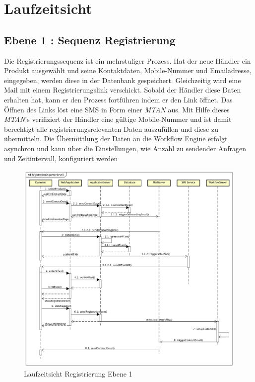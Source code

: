 \graphicspath{{./images/}}

\chapter{Laufzeitsicht}

\section{Ebene 1 : Sequenz Registrierung}

Die Registrierungssequenz ist ein mehrstufiger Prozess. Hat der neue Händler ein Produkt ausgewählt und seine Kontaktdaten, Mobile-Nummer und Emailadresse, eingegeben, werden diese in der Datenbank gespeichert. Gleichzeitig wird eine Mail mit einem Registrierungslink verschickt. Sobald der Händler diese Daten erhalten hat, kann er den Prozess fortführen indem er den Link öffnet. Das Öffnen des Links löst eine SMS in Form einer \textit{\gls{MTAN}} aus. Mit Hilfe dieses \textit{\gls{MTAN}}'s verifiziert der Händler eine gültige Mobile-Nummer und ist damit berechtigt alle registrierungsrelevanten Daten auszufüllen und diese zu übermitteln. Die Übermittlung der Daten an die Workflow Engine erfolgt asynchron und kann über die Einstellungen, wie Anzahl zu sendender Anfragen und Zeitintervall, konfiguriert werden
\begin{figure}[H]
	\centering
	\includegraphics[scale=0.44]{RegistrationSequenceLevel1.png}
	\caption{Laufzeitsicht Registrierung Ebene 1}
\end{figure}
\newpage

